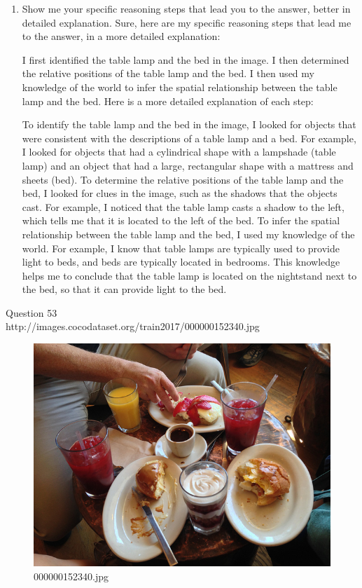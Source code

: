 \begin{enumerate}
    Here are some additional details about the spatial relationship between the table lamp and the bed:
    
    The table lamp is a small, portable lamp that is used to provide light.
    The bed is a piece of furniture that is used for sleeping.
    The table lamp is located on the nightstand, which is a small table that is typically located next to the bed.
    The nightstand is located next to the bed, meaning that it is close to the bed.
    I hope this helps! Let me know if you have any other questions.
    \item Show me your specific reasoning steps that lead you to the answer, better in detailed explanation.
    \subitem 
    Sure, here are my specific reasoning steps that lead me to the answer, in a more detailed explanation:
    
    I first identified the table lamp and the bed in the image.
    I then determined the relative positions of the table lamp and the bed.
    I then used my knowledge of the world to infer the spatial relationship between the table lamp and the bed.
    Here is a more detailed explanation of each step:
    
    To identify the table lamp and the bed in the image, I looked for objects that were consistent with the descriptions of a table lamp and a bed. For example, I looked for objects that had a cylindrical shape with a lampshade (table lamp) and an object that had a large, rectangular shape with a mattress and sheets (bed).
    To determine the relative positions of the table lamp and the bed, I looked for clues in the image, such as the shadows that the objects cast. For example, I noticed that the table lamp casts a shadow to the left, which tells me that it is located to the left of the bed.
    To infer the spatial relationship between the table lamp and the bed, I used my knowledge of the world. For example, I know that table lamps are typically used to provide light to beds, and beds are typically located in bedrooms. This knowledge helps me to conclude that the table lamp is located on the nightstand next to the bed, so that it can provide light to the bed.
\end{enumerate}
Question 53\\
http://images.cocodataset.org/train2017/000000152340.jpg
\begin{figure}[h]
    \centering
    \includegraphics[width=0.8\linewidth]{../image set/hard/000000152340.jpg}
    \caption{000000152340.jpg}
\end{figure}
